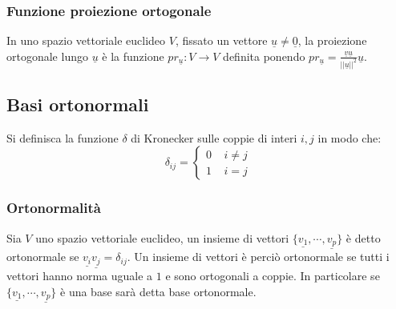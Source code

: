 \subsubsection{Funzione proiezione ortogonale}
In uno spazio vettoriale euclideo $V$, fissato un vettore $\underline{u}\neq \underline{0}$, la proiezione ortogonale lungo $\underline{u}$ \`e la funzione $pr_{\underline{u}}:V
\rightarrow V$ definita ponendo $pr_{\underline{u}}=\frac{\underline{v}\underline{u}}{||\underline{u}||^2}\underline{u}$.
\subsection{Basi ortonormali}
Si definisca la funzione $\delta$ di Kronecker sulle coppie di interi $i,j$ in modo che:
\begin{equation}
\delta_{ij}=\begin{cases}
0\;\;\;\;i\neq j\\
1\;\;\;\;i=j
\end{cases}
\end{equation}
\subsubsection{Ortonormalit\`a}
Sia $V$ uno spazio vettoriale euclideo, un insieme di vettori $\{\underline{v_1},\cdots,\underline{v_p}\}$ \`e detto ortonormale se $\underline{v_i}\underline{v_j}=\delta_{ij}$. 
Un insieme di vettori \`e perci\`o ortonormale se tutti i vettori hanno norma uguale a $1$ e sono ortogonali a coppie. In particolare se $\{\underline{v_1},\cdots,\underline{v_p}
\}$ \`e una base sar\`a detta base ortonormale.
